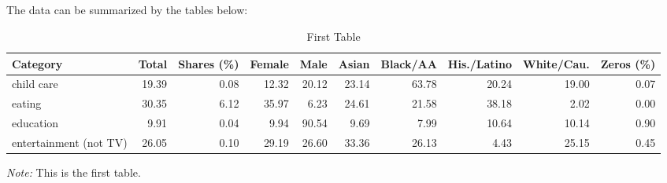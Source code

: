 \documentclass[letterpaper]{report}
\begin{document}
\begin{appendices}
\chapter{}\setcounter{table}{0}

The data can be summarized by the tables below:

\renewcommand*\arraystretch{0.95}
\renewcommand{\tabcolsep}{6pt}
\begin{table}[H]
  \renewcommand{\thetable}{B.\arabic{table}a}
  \caption{First Table}
  \label{summary_a}
  \fontsize{9}{11}\selectfont
  \hspace*{-0.5cm}
  \begin{tabular}{lrrrrrrrrr}
    \toprule
    Category                   & Total & Shares (\%) & Female & Male  & Asian & Black/AA & His./Latino & White/Cau. & Zeros (\%) \\ \hline
    child care                 & 19.39 & 0.08   & 12.32  & 20.12 & 23.14 & 63.78    & 20.24       & 19.00      & 0.07  \\
    eating                     & 30.35 & 6.12   & 35.97  & 6.23 & 24.61 & 21.58    & 38.18       & 2.02      & 0.00  \\
    education                  & 9.91  & 0.04   & 9.94   & 90.54  & 9.69  & 7.99     & 10.64        & 10.14      & 0.90  \\
    entertainment (not TV)     & 26.05 & 0.10   & 29.19  & 26.60 & 33.36 & 26.13    & 4.43       & 25.15      & 0.45  \\ \bottomrule
  \end{tabular}
  \hspace*{-1cm}
  \begin{minipage}{1.065\textwidth}
    \onehalfspacing
    \vspace*{0.05cm}
    \begin{tablenotes}
      \footnotesize
      \item\textit{Note:} This is the first table.
    \end{tablenotes}
  \end{minipage}
\end{table}


\end{appendices}
\end{document}

